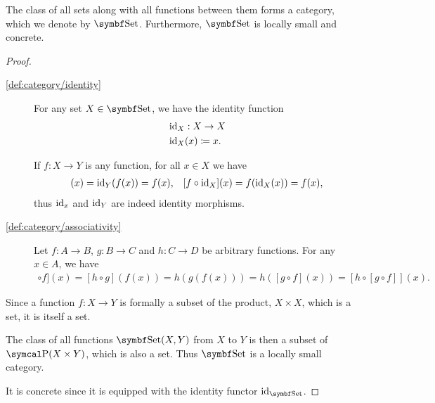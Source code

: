 \begin{definition}\label{def:category_of_sets}
  The class of all sets along with all functions between them forms a category, which we denote by \( \Bold{Set} \). Furthermore, \( \Bold{Set} \) is locally small and concrete.
\end{definition}
\begin{proof}
  \begin{description}
    \item [\ref{def:category/identity}] For any set \( X \in \Bold{Set} \), we have the identity function
    \begin{align*}
      &\operatorname{id}_X: X \to X \\
      &\operatorname{id}_X(x) \coloneqq x.
    \end{align*}

    If \( f: X \to Y \) is any function, for all \( x \in X \) we have
    \begin{align*}
      [\Id_Y \circ f](x) = \Id_Y(f(x)) = f(x),
      &&
      [f \circ \Id_X](x) = f(\Id_X(x)) = f(x),
    \end{align*}
    thus \( \operatorname{id}_x \) and \( \operatorname{id}_Y \) are indeed identity morphisms.

    \item [\ref{def:category/associativity}] Let \( f: A \to B \), \( g: B \to C \) and \( h: C \to D \) be arbitrary functions. For any \( x \in A \), we have
    \begin{align*}
      [[h \circ g] \circ f](x)
      =
      [h \circ g](f(x))
      =
      h(g(f(x)))
      =
      h([g \circ f](x))
      =
      [h \circ [g \circ f]](x).
    \end{align*}
  \end{description}

  Since a function \( f: X \to Y \) is formally a subset of the product, \( X \times X \), which is a set, it is itself a set.

  The class of all functions \( \Bold{Set}(X, Y) \) from \( X \) to \( Y \) is then a subset of \( \Power(X \times Y) \), which is also a set. Thus \( \Bold{Set} \) is a locally small category.

  It is concrete since it is equipped with the identity functor \( \Id_{\Bold{Set}} \).
\end{proof}

